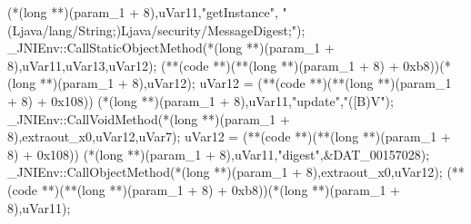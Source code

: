 \documentclass[
]{article}
\newenvironment{Shaded}{}{}
\newcommand{\BaseNTok}[1]{\textcolor[rgb]{0.25,0.63,0.44}{#1}}
\newcommand{\DataTypeTok}[1]{\textcolor[rgb]{0.56,0.13,0.00}{#1}}
\newcommand{\DecValTok}[1]{\textcolor[rgb]{0.25,0.63,0.44}{#1}}
\newcommand{\NormalTok}[1]{#1}
\newcommand{\OperatorTok}[1]{\textcolor[rgb]{0.40,0.40,0.40}{#1}}
\newcommand{\StringTok}[1]{\textcolor[rgb]{0.25,0.44,0.63}{#1}}
\begin{document}
\begin{Shaded}
\begin{Highlighting}[]
                     \OperatorTok{(*(}\DataTypeTok{long} \OperatorTok{**)(}\NormalTok{param\_1 }\OperatorTok{+} \DecValTok{8}\OperatorTok{),}\NormalTok{uVar11}\OperatorTok{,}\StringTok{"getInstance"}\OperatorTok{,}
                      \StringTok{"(Ljava/lang/String;)Ljava/security/MessageDigest;"}\OperatorTok{);}
\NormalTok{  \_JNIEnv}\OperatorTok{::}\NormalTok{CallStaticObjectMethod}\OperatorTok{(*(}\DataTypeTok{long} \OperatorTok{**)(}\NormalTok{param\_1 }\OperatorTok{+} \DecValTok{8}\OperatorTok{),}\NormalTok{uVar11}\OperatorTok{,}\NormalTok{uVar13}\OperatorTok{,}\NormalTok{uVar12}\OperatorTok{);}
  \OperatorTok{(**(}\NormalTok{code }\OperatorTok{**)(**(}\DataTypeTok{long} \OperatorTok{**)(}\NormalTok{param\_1 }\OperatorTok{+} \DecValTok{8}\OperatorTok{)} \OperatorTok{+} \BaseNTok{0xb8}\OperatorTok{))(*(}\DataTypeTok{long} \OperatorTok{**)(}\NormalTok{param\_1 }\OperatorTok{+} \DecValTok{8}\OperatorTok{),}\NormalTok{uVar12}\OperatorTok{);}
\NormalTok{  uVar12 }\OperatorTok{=} \OperatorTok{(**(}\NormalTok{code }\OperatorTok{**)(**(}\DataTypeTok{long} \OperatorTok{**)(}\NormalTok{param\_1 }\OperatorTok{+} \DecValTok{8}\OperatorTok{)} \OperatorTok{+} \BaseNTok{0x108}\OperatorTok{))}
                     \OperatorTok{(*(}\DataTypeTok{long} \OperatorTok{**)(}\NormalTok{param\_1 }\OperatorTok{+} \DecValTok{8}\OperatorTok{),}\NormalTok{uVar11}\OperatorTok{,}\StringTok{"update"}\OperatorTok{,}\StringTok{"([B)V"}\OperatorTok{);}
\NormalTok{  \_JNIEnv}\OperatorTok{::}\NormalTok{CallVoidMethod}\OperatorTok{(*(}\DataTypeTok{long} \OperatorTok{**)(}\NormalTok{param\_1 }\OperatorTok{+} \DecValTok{8}\OperatorTok{),}\NormalTok{extraout\_x0}\OperatorTok{,}\NormalTok{uVar12}\OperatorTok{,}\NormalTok{uVar7}\OperatorTok{);}
\NormalTok{  uVar12 }\OperatorTok{=} \OperatorTok{(**(}\NormalTok{code }\OperatorTok{**)(**(}\DataTypeTok{long} \OperatorTok{**)(}\NormalTok{param\_1 }\OperatorTok{+} \DecValTok{8}\OperatorTok{)} \OperatorTok{+} \BaseNTok{0x108}\OperatorTok{))}
                     \OperatorTok{(*(}\DataTypeTok{long} \OperatorTok{**)(}\NormalTok{param\_1 }\OperatorTok{+} \DecValTok{8}\OperatorTok{),}\NormalTok{uVar11}\OperatorTok{,}\StringTok{"digest"}\OperatorTok{,\&}\NormalTok{DAT\_00157028}\OperatorTok{);}
\NormalTok{  \_JNIEnv}\OperatorTok{::}\NormalTok{CallObjectMethod}\OperatorTok{(*(}\DataTypeTok{long} \OperatorTok{**)(}\NormalTok{param\_1 }\OperatorTok{+} \DecValTok{8}\OperatorTok{),}\NormalTok{extraout\_x0}\OperatorTok{,}\NormalTok{uVar12}\OperatorTok{);}
  \OperatorTok{(**(}\NormalTok{code }\OperatorTok{**)(**(}\DataTypeTok{long} \OperatorTok{**)(}\NormalTok{param\_1 }\OperatorTok{+} \DecValTok{8}\OperatorTok{)} \OperatorTok{+} \BaseNTok{0xb8}\OperatorTok{))(*(}\DataTypeTok{long} \OperatorTok{**)(}\NormalTok{param\_1 }\OperatorTok{+} \DecValTok{8}\OperatorTok{),}\NormalTok{uVar11}\OperatorTok{);}

\end{Highlighting}
\end{Shaded}
\end{document}
